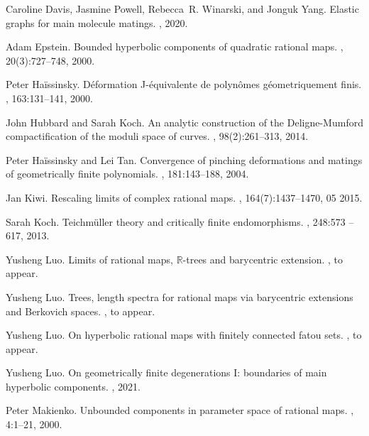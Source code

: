 \documentclass[11pt, reqno]{amsart}
\numberwithin{equation}{section}
\theoremstyle{plain}
\theoremstyle{theorem}
\theoremstyle{definition}
\numberwithin{figure}{section}
\begin{document}
\begin{thebibliography}{DPWY20}
Caroline Davis, Jasmine Powell, Rebecca~R. Winarski, and Jonguk Yang.
\newblock Elastic graphs for main molecule matings.
, 2020.

Adam Epstein.
\newblock Bounded hyperbolic components of quadratic rational maps.
, 20(3):727--748, 2000.

Peter Ha{\"i}ssinsky.
\newblock D\'eformation {J}-\'equivalente de polyn\^omes g\'eometriquement
  finis.
, 163:131--141, 2000.

John Hubbard and Sarah Koch.
\newblock An analytic construction of the {Deligne-Mumford compactification} of
  the moduli space of curves.
, 98(2):261--313, 2014.

Peter Ha{\"i}ssinsky and Lei Tan.
\newblock Convergence of pinching deformations and matings of geometrically
  finite polynomials.
, 181:143--188, 2004.

Jan Kiwi.
\newblock Rescaling limits of complex rational maps.
, 164(7):1437--1470, 05 2015.

Sarah Koch.
\newblock Teichmüller theory and critically finite endomorphisms.
, 248:573 -- 617, 2013.

Yusheng Luo.
\newblock Limits of rational maps, $\mathbb{R}$-trees and barycentric
  extension.
, to appear.

Yusheng Luo.
\newblock Trees, length spectra for rational maps via barycentric extensions and {Berkovich} spaces.
, to appear.

Yusheng Luo.
\newblock On hyperbolic rational maps with finitely connected fatou sets.
, to appear.

Yusheng Luo.
\newblock On geometrically finite degenerations {I}: boundaries of main
  hyperbolic components.
, 2021.

Peter Makienko.
\newblock Unbounded components in parameter space of rational maps.
, 4:1--21, 2000.


\end{thebibliography}
\end{document}
